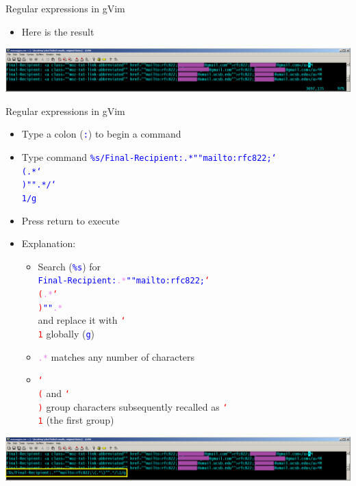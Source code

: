 \documentclass[professionalfont,10pt]{beamer}
\begin{document}
\begin{frame}{Regular expressions in gVim}
\begin{itemize}
\item Here is the result
\end{itemize}
\vspace{0.25cm}
\includegraphics[width=\textwidth]{vim-csv-2.png}
\end{frame}

\begin{frame}{Regular expressions in gVim}
\begin{itemize}
\item Type a colon (\textcolor{blue}{\texttt{:}}) to begin a command
\item Type command \textcolor{blue}{\texttt{\%s/Final-Recipient:.*""mailto:rfc822;\char`\\(.*\char`\\)"".*/\char`\\1/g}}
\item Press return to execute
\vspace{0.25cm}
\item Explanation:
\begin{itemize}
\item Search (\texttt{\textcolor{blue}{\%s}}) for \\ \texttt{\textcolor{blue}{Final-Recipient:\textcolor{violet}{.*}""mailto:rfc822;\textcolor{red}{\char`\\(}\textcolor{violet}{.*}\textcolor{red}{\char`\\)}""\textcolor{violet}{.*}}} \\ and replace it with \texttt{\textcolor{red}{\char`\\1}} globally (\texttt{\textcolor{blue}{g}})
\item \texttt{\textcolor{violet}{.*}} matches any number of characters
\item \texttt{\textcolor{red}{\char`\\(}} and \texttt{\textcolor{red}{\char`\\)}} group characters subsequently recalled as \texttt{\textcolor{red}{\char`\\1}} (the first group)
\end{itemize}
\end{itemize}
\vspace{0.25cm}
\includegraphics[width=\textwidth]{vim-csv-3.png}
\end{frame}
\end{document}
